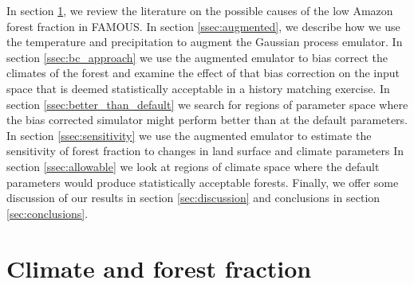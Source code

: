 \documentclass[gmd, manuscript]{copernicus}
\begin{document}
In section \ref{sec:climate_and_frac}, we review the literature on the possible causes of the low Amazon forest fraction in FAMOUS. In section \ref{ssec:augmented}, we describe how we use the temperature and precipitation to augment the Gaussian process emulator. In section \ref{ssec:bc_approach} we use the augmented emulator to bias correct the climates of the forest and examine the effect of that bias correction on the input space that is deemed statistically acceptable in a history matching exercise. In section \ref{ssec:better_than_default} we search for regions of parameter space where the bias corrected simulator might perform better than at the default parameters. In section \ref{ssec:sensitivity} we use the augmented emulator to estimate the sensitivity of forest fraction to changes in land surface and climate parameters In section \ref{ssec:allowable} we look at regions of climate space where the default parameters would produce statistically acceptable forests. Finally, we offer some discussion of our results in section \ref{sec:discussion} and conclusions in section \ref{sec:conclusions}.

\section{Climate and forest fraction}\label{sec:climate_and_frac}
\end{document}
